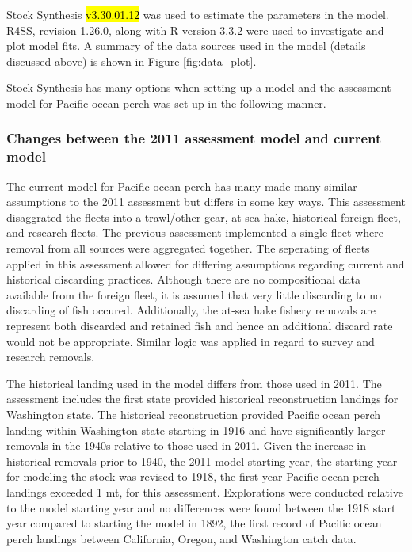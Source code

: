 \documentclass[12pt,]{article}
\begin{document}
Stock Synthesis \hl{v3.30.01.12} was used to estimate the parameters in
the model. R4SS, revision 1.26.0, along with R version 3.3.2 were used
to investigate and plot model fits. A summary of the data sources used
in the model (details discussed above) is shown in Figure
\ref{fig:data_plot}.

Stock Synthesis has many options when setting up a model and the
assessment model for Pacific ocean perch was set up in the following
manner.

\subsubsection{Changes between the 2011 assessment model and current
model}\label{changes-between-the-2011-assessment-model-and-current-model}

The current model for Pacific ocean perch has many made many similar
assumptions to the 2011 assessment but differs in some key ways. This
assessment disaggrated the fleets into a trawl/other gear, at-sea hake,
historical foreign fleet, and research fleets. The previous assessment
implemented a single fleet where removal from all sources were
aggregated together. The seperating of fleets applied in this assessment
allowed for differing assumptions regarding current and historical
discarding practices. Although there are no compositional data available
from the foreign fleet, it is assumed that very little discarding to no
discarding of fish occured. Additionally, the at-sea hake fishery
removals are represent both discarded and retained fish and hence an
additional discard rate would not be appropriate. Similar logic was
applied in regard to survey and research removals.

The historical landing used in the model differs from those used in
2011. The assessment includes the first state provided historical
reconstruction landings for Washington state. The historical
reconstruction provided Pacific ocean perch landing within Washington
state starting in 1916 and have significantly larger removals in the
1940s relative to those used in 2011. Given the increase in historical
removals prior to 1940, the 2011 model starting year, the starting year
for modeling the stock was revised to 1918, the first year Pacific ocean
perch landings exceeded 1 mt, for this assessment. Explorations were
conducted relative to the model starting year and no differences were
found between the 1918 start year compared to starting the model in
1892, the first record of Pacific ocean perch landings between
California, Oregon, and Washington catch data.
\end{document}

